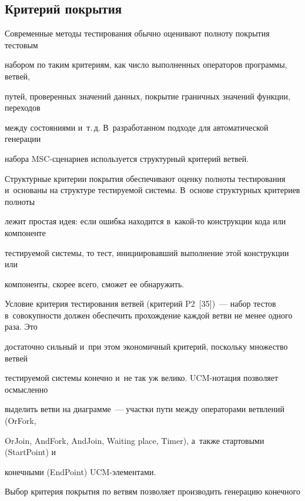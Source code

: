 \subsection{Критерий покрытия}





    Современные методы тестирования обычно оценивают полноту покрытия тестовым


набором по таким критериям, как число выполненных операторов программы, ветвей,


путей, проверенных значений данных, покрытие граничных значений функции, переходов


между состояниями и~т.\,д. В~разработанном подходе для автоматической генерации


набора MSC-сце\-на\-ри\-ев используется структурный критерий ветвей.





   Структурные критерии покрытия обеспечивают оценку полноты тестирования и~основаны на структуре тестируемой системы. В~основе структурных критериев полноты


лежит простая идея: если ошибка находится в~какой-то конструкции кода или компоненте


тестируемой системы, то тест, инициировавший выполнение этой конструкции или


компоненты, скорее всего, сможет ее обнаружить.





   Условие критерия тестирования ветвей (критерий P2~[35])~--- набор тестов в~совокупности должен обеспечить прохождение каждой ветви не менее одного раза. Это


достаточно сильный и~при этом экономичный критерий, поскольку множество ветвей


тестируемой системы конечно и~не так уж велико. UCM-но\-та\-ция позволяет осмысленно


выделить ветви на диаграмме~--- участки пути между операторами ветвлений (OrFork,


OrJoin, AndFork, AndJoin, Waiting place, Timer), а~также стартовыми (StartPoint) и


конечными (EndPoint) UCM-эле\-ментами.





   Выбор критерия покрытия по ветвям позволяет производить генерацию конечного


